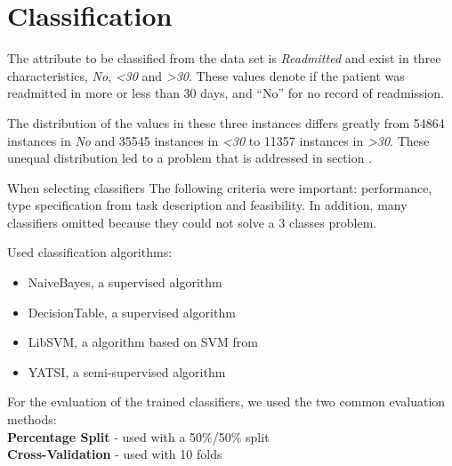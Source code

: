 \section{Classification}
\label{classification}

The attribute to be classified from the data set is \textit{Readmitted} and exist in three characteristics, \textit{No},\textit{ \textless 30} and \textit{ \textgreater 30}. These values denote if the patient was readmitted in more or less than 30 days, and “No” for no record of readmission. \cite{OlmoMedicos}

The distribution of the values in these three instances differs greatly from 54864 instances in \textit{No} and 35545 instances in \textit{ \textless 30} to 11357 instances in \textit{ \textgreater 30}. These unequal distribution led to a problem that is addressed in section . 

When selecting classifiers The following criteria were important: performance, type specification from task description and feasibility.
In addition, many classifiers omitted because they could not solve a 3 classes problem.

Used classification algorithms:
\begin{itemize}
	\item[\textbullet] NaiveBayes, a supervised algorithm 
	\item[\textbullet] DecisionTable, a supervised algorithm 
	\item[\textbullet] LibSVM, a algorithm based on SVM from 
	\item[\textbullet] YATSI, a semi-supervised algorithm
\end{itemize}



For the evaluation of the trained classifiers, we used the two common evaluation methods:\\
\textbf{Percentage Split} - used with a 50\%/50\% split\\
\textbf{Cross-Validation} - used with 10 folds\\



